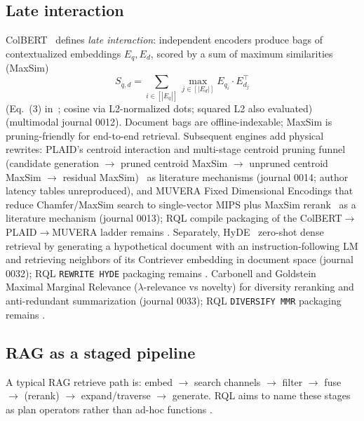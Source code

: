 \subsection{Late interaction}
ColBERT~\citep{khattab2020colbert} defines \emph{late interaction}: independent encoders produce bags of contextualized embeddings \(E_q,E_d\), scored by a sum of maximum similarities (MaxSim)
\[
S_{q,d}=\sum_{i\in[|E_q|]}\max_{j\in[|E_d|]} E_{q_i}\cdot E_{d_j}^{\top}
\]
(Eq.~(3) in~\citet{khattab2020colbert}; cosine via L2-normalized dots; squared L2 also evaluated) \established{} (multimodal journal 0012).
Document bags are offline-indexable; MaxSim is pruning-friendly for end-to-end retrieval.
Subsequent engines add physical rewrites: PLAID's centroid interaction and multi-stage centroid pruning funnel (candidate generation $\rightarrow$ pruned centroid MaxSim $\rightarrow$ unpruned centroid MaxSim $\rightarrow$ residual MaxSim)~\citep{santhanam2022plaid} \established{} as literature mechanisms (journal 0014; author latency tables unreproduced), and MUVERA Fixed Dimensional Encodings that reduce Chamfer/MaxSim search to single-vector MIPS plus MaxSim rerank~\citep{jayaram2024muvera} \established{} as a literature mechanism (journal 0013); RQL compile packaging of the ColBERT$\rightarrow$PLAID$\rightarrow$MUVERA ladder remains \hypothesis{}.
Separately, HyDE~\citep{gao2023hyde} \established{} zero-shot dense retrieval by generating a hypothetical document with an instruction-following LM and retrieving neighbors of its Contriever embedding in document space (journal 0032); RQL \texttt{REWRITE HYDE} packaging remains \hypothesis{}.
Carbonell and Goldstein~\citep{carbonell1998mmr} \established{} Maximal Marginal Relevance ($\lambda$-relevance vs novelty) for diversity reranking and anti-redundant summarization (journal 0033); RQL \texttt{DIVERSIFY MMR} packaging remains \hypothesis{}.

\subsection{RAG as a staged pipeline}
A typical RAG retrieve path is: embed $\rightarrow$ search channels $\rightarrow$ filter $\rightarrow$ fuse $\rightarrow$ (rerank) $\rightarrow$ expand/traverse $\rightarrow$ generate.
RQL aims to name these stages as plan operators rather than ad-hoc functions \hypothesis{}.
